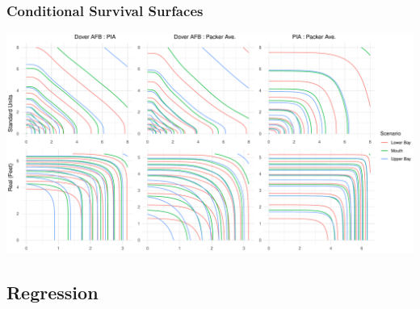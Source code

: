 \documentclass[aspectratio=169,10pt,notes]{beamer}
\newlength{\frametextheight}
\begin{document}
\begin{frame}
    \frametitle{Conditional Survival Surfaces}
    \begin{center}
        \includegraphics[height=0.99\frametextheight]{./ch3/plots/condsurv/condsurv_2d_mcmc_combined}
    \end{center}
\end{frame} %

\subsection{Regression}
\end{document}

